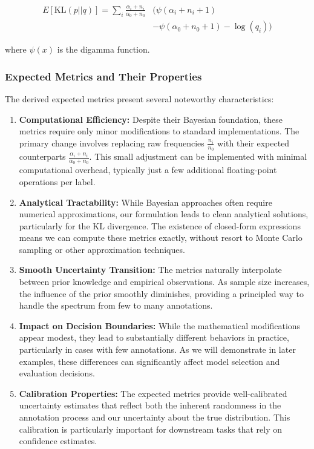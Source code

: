 \documentclass[journal]{IEEEtran}
\begin{document}
\begin{equation}
\begin{split}
E[\text{KL}(p||q)] = \sum_i \frac{\alpha_i + n_i}{\alpha_0 + n_0} & (\psi(\alpha_i + n_i + 1) \\
 & - \psi(\alpha_0 + n_0 + 1) - \log(q_i))
\end{split}
\end{equation}

where $\psi(x)$ is the digamma function.

\subsubsection{Expected Metrics and Their Properties}
The derived expected metrics present several noteworthy characteristics:

\begin{enumerate}
\item \textbf{Computational Efficiency:} Despite their Bayesian foundation, these metrics require only minor modifications to standard implementations. The primary change involves replacing raw frequencies $\frac{n_i}{n_0}$ with their expected counterparts $\frac{\alpha_i + n_i}{\alpha_0 + n_0}$. This small adjustment can be implemented with minimal computational overhead, typically just a few additional floating-point operations per label.

\item \textbf{Analytical Tractability:} While Bayesian approaches often require numerical approximations, our formulation leads to clean analytical solutions, particularly for the KL divergence. The existence of closed-form expressions means we can compute these metrics exactly, without resort to Monte Carlo sampling or other approximation techniques.

\item \textbf{Smooth Uncertainty Transition:} The metrics naturally interpolate between prior knowledge and empirical observations. As sample size increases, the influence of the prior smoothly diminishes, providing a principled way to handle the spectrum from few to many annotations.

\item \textbf{Impact on Decision Boundaries:} While the mathematical modifications appear modest, they lead to substantially different behaviors in practice, particularly in cases with few annotations. As we will demonstrate in later examples, these differences can significantly affect model selection and evaluation decisions.

\item \textbf{Calibration Properties:} The expected metrics provide well-calibrated uncertainty estimates that reflect both the inherent randomness in the annotation process and our uncertainty about the true distribution. This calibration is particularly important for downstream tasks that rely on confidence estimates.
\end{enumerate}
\end{document}
